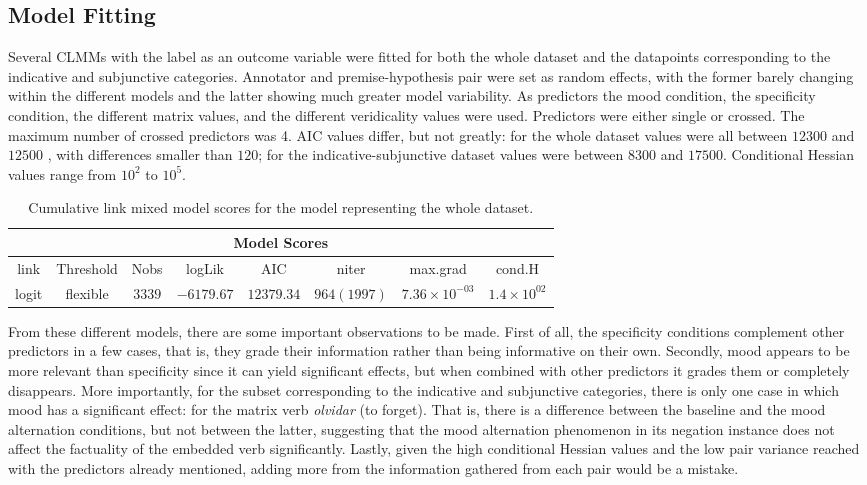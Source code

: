 \subsection{Model Fitting}\label{subsect:mod}
Several CLMMs with the label as an outcome variable were fitted for both the whole dataset and the datapoints corresponding to the indicative and subjunctive categories. Annotator and premise-hypothesis pair were set as random effects, with the former barely changing within the different models and the latter showing much greater model variability. As predictors the mood condition, the specificity condition, the different matrix values, and the different veridicality values were used. Predictors were either single or crossed. The maximum number of crossed predictors was 4. AIC values differ, but not greatly: for the whole dataset values were all between $12300$ and $12500$ , with differences smaller than $120$; for the indicative-subjunctive dataset values were between $8300$ and $17500$. Conditional Hessian values range from $10^{2}$ to $10^{5}$.\\

\begin{table}
\center
\begin{tabular}{|c|c|c|c|c|c|c|c|}
\hline
\multicolumn{8}{|c|}{Model Scores}\\\hline
link  &  Threshold & Nobs & logLik & AIC & niter & max.grad & cond.H\\\hline
logit & flexible & $3339$ & $-6179.67$ & $12379.34$ & $964(1997)$ & $7.36\times10^{-03}$ &$1.4\times10^{02}$\\\hline
\end{tabular}
\caption[Model Scores.]{Cumulative link mixed model scores for the model representing the whole dataset.}
\label{tab:modscores}
\end{table}

From these different models, there are some important observations to be made. First of all, the specificity conditions complement other predictors in a few cases, that is, they grade their information rather than being informative on their own. Secondly, mood appears to be more relevant than specificity since it can yield significant effects, but when combined with other predictors it grades them or completely disappears. More importantly, for the subset corresponding to the indicative and subjunctive categories, there is only one case in which mood has a significant effect: for the matrix verb \textit{olvidar} (to forget). That is, there is a difference between the baseline and the mood alternation conditions, but not between the latter, suggesting that the mood alternation phenomenon in its negation instance does not affect the factuality of the embedded verb significantly. Lastly, given the high conditional Hessian values and the low pair variance reached with the predictors already mentioned, adding more from the information gathered from each pair would be a mistake.\\

